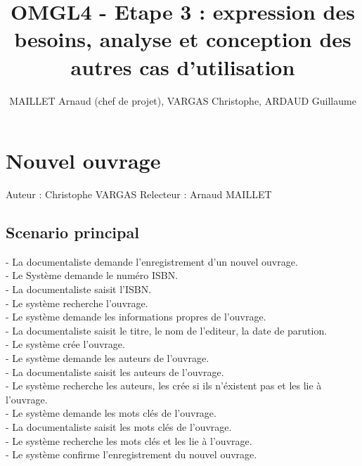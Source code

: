 \documentclass[a4paper,10pt]{report}
\title{OMGL4 - Etape 3 : expression des besoins, analyse et conception des autres cas d'utilisation}
\author{MAILLET Arnaud (chef de projet), VARGAS Christophe, ARDAUD Guillaume}
\begin{document}
\maketitle
\newpage
\null
\newpage
\tableofcontents
\newpage
\null
\newpage

\centering


\chapter*{Nouvel ouvrage}

Auteur : Christophe VARGAS
Relecteur : Arnaud MAILLET

\bigskip
\section*{Scenario principal}
\begin{flushleft}
- La documentaliste demande l'enregistrement d'un nouvel ouvrage.\\
- Le Système demande le numéro ISBN.\\
- La documentaliste saisit l'ISBN.\\
- Le système recherche l'ouvrage.\\
- Le système demande les informations propres de l'ouvrage.\\
- La documentaliste saisit le titre, le nom de l'editeur, la date de parution.\\
- Le système crée l'ouvrage.\\
- Le système demande les auteurs de l'ouvrage.\\
- La documentaliste saisit les auteurs de l'ouvrage.\\
- Le système recherche les auteurs, les crée si ils n'éxistent pas et les lie à l'ouvrage.\\
- Le système demande les mots clés de l'ouvrage.\\
- La documentaliste saisit les mots clés de l'ouvrage.\\
- Le système recherche les mots clés et les lie à l'ouvrage.\\
- Le système confirme l'enregistrement du nouvel ouvrage.\\
\end{flushleft}
\end{document}
